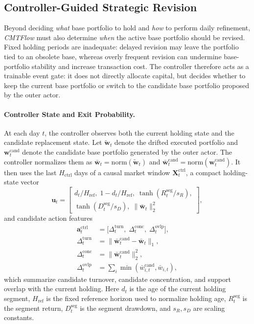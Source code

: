 \documentclass[letterpaper]{article} %
\begin{document}
\subsection{Controller-Guided Strategic Revision}

Beyond deciding \emph{what} base portfolio to hold and \emph{how} to perform daily refinement, \textit{CMTFlow} must also determine \emph{when} the active base portfolio should be revised. Fixed holding periods are inadequate: delayed revision may leave the portfolio tied to an obsolete base, whereas overly frequent revision can undermine base-portfolio stability and increase transaction cost. The controller therefore acts as a trainable event gate: it does not directly allocate capital, but decides whether to keep the current base portfolio or switch to the candidate base portfolio proposed by the outer actor.

\paragraph{Controller State and Exit Probability.}
At each day \(t\), the controller observes both the current holding state and the candidate replacement state. Let \(\tilde{\mathbf{w}}_t\) denote the drifted executed portfolio and \(\mathbf{w}_t^{\mathrm{cand}}\) denote the candidate base portfolio generated by the outer actor. The controller normalizes them as \(\bar{\mathbf{w}}_t=\mathrm{norm}(\tilde{\mathbf{w}}_t)\) and \(\bar{\mathbf{w}}_t^{\mathrm{cand}}=\mathrm{norm}(\mathbf{w}_t^{\mathrm{cand}})\). It then uses the last \(H_{\mathrm{ctrl}}\) days of a causal market window \(\mathbf{X}_{t}^{\mathrm{ctrl}}\), a compact holding-state vector
\[
\mathbf{u}_t
=
\begin{bmatrix}
d_t/H_{\mathrm{ref}},\;1-d_t/H_{\mathrm{ref}},\;
\tanh(R_t^{\mathrm{seg}}/s_R),\\
\tanh(D_t^{\mathrm{seg}}/s_D),\;
\|\bar{\mathbf{w}}_t\|_2^2
\end{bmatrix},
\]
and candidate action features
\[
\begin{aligned}
\mathbf{a}^{\mathrm{ctrl}}_t
&=
\bigl[
\Delta_t^{\mathrm{turn}},\;
\Delta_t^{\mathrm{conc}},\;
\Delta_t^{\mathrm{ovlp}}
\bigr],\\
\Delta_t^{\mathrm{turn}}
&=\|\bar{\mathbf{w}}_t^{\mathrm{cand}}-\bar{\mathbf{w}}_t\|_1,\\
\Delta_t^{\mathrm{conc}}
&=\|\bar{\mathbf{w}}_t^{\mathrm{cand}}\|_2^2,\\
\Delta_t^{\mathrm{ovlp}}
&=\sum_i \min(\bar{w}_{i,t}^{\mathrm{cand}},\bar{w}_{i,t}),
\end{aligned}
\]
which summarize candidate turnover, candidate concentration, and support overlap with the current holding. Here \(d_t\) is the age of the current holding segment, \(H_{\mathrm{ref}}\) is the fixed reference horizon used to normalize holding age, \(R_t^{\mathrm{seg}}\) is the segment return, \(D_t^{\mathrm{seg}}\) is the segment drawdown, and \(s_R,s_D\) are scaling constants.
\end{document}
